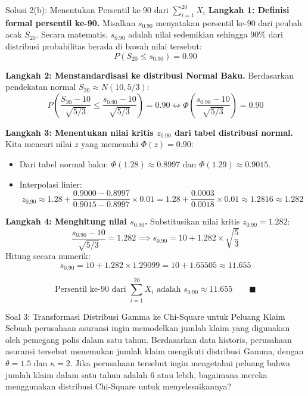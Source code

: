 \documentclass[10pt,twoside]{article}
\begin{document}
\begin{solbox}{Solusi 2(b): Menentukan Persentil ke-90 dari $\sum_{i=1}^{20} X_i$}
\textbf{Langkah 1: Definisi formal persentil ke-90.}
Misalkan $s_{0.90}$ menyatakan persentil ke-90 dari peubah acak $S_{20}$.
Secara matematis, $s_{0.90}$ adalah nilai sedemikian sehingga $90\%$ dari distribusi probabilitas berada di bawah nilai tersebut:
\[
P(S_{20} \le s_{0.90}) = 0.90
\]

\textbf{Langkah 2: Menstandardisasi ke distribusi Normal Baku.}
Berdasarkan pendekatan normal $S_{20} \approx N(10, 5/3)$:
\[
P\left(\frac{S_{20} - 10}{\sqrt{5/3}} \le \frac{s_{0.90} - 10}{\sqrt{5/3}}\right) = 0.90 \iff \Phi\left(\frac{s_{0.90} - 10}{\sqrt{5/3}}\right) = 0.90
\]

\textbf{Langkah 3: Menentukan nilai kritis $z_{0.90}$ dari tabel distribusi normal.}
Kita mencari nilai $z$ yang memenuhi $\Phi(z) = 0.90$:
\begin{itemize}
  \item Dari tabel normal baku: $\Phi(1.28) \approx 0.8997$ dan $\Phi(1.29) \approx 0.9015$.
  \item Interpolasi linier:
  \[
  z_{0.90} \approx 1.28 + \frac{0.9000 - 0.8997}{0.9015 - 0.8997} \times 0.01 = 1.28 + \frac{0.0003}{0.0018} \times 0.01 \approx 1.2816 \approx 1.282
  \]
\end{itemize}

\textbf{Langkah 4: Menghitung nilai $s_{0.90}$.}
Substitusikan nilai kritis $z_{0.90} = 1.282$:
\[
\frac{s_{0.90} - 10}{\sqrt{5/3}} = 1.282 \implies s_{0.90} = 10 + 1.282 \times \sqrt{\frac{5}{3}}
\]
Hitung secara numerik:
\[
s_{0.90} = 10 + 1.282 \times 1.29099 = 10 + 1.65505 \approx 11.655
\]

\[
\boxed{\text{Persentil ke-90 dari } \sum_{i=1}^{20} X_i \text{ adalah } s_{0.90} \approx 11.655} \qquad \blacksquare
\]
\end{solbox}

\begin{soalbox}{Soal 3: Transformasi Distribusi Gamma ke Chi-Square untuk Peluang Klaim}
Sebuah perusahaan asuransi ingin memodelkan jumlah klaim yang digunakan oleh pemegang polis dalam satu tahun. Berdasarkan data historis, perusahaan asuransi tersebut menemukan jumlah klaim mengikuti distribusi Gamma, dengan $\theta = 1.5$ dan $\kappa = 2$. Jika perusahaan tersebut ingin mengetahui peluang bahwa jumlah klaim dalam satu tahun adalah 6 atau lebih, bagaimana mereka menggunakan distribusi Chi-Square untuk menyelesaikannya?
\end{soalbox}
\end{document}
